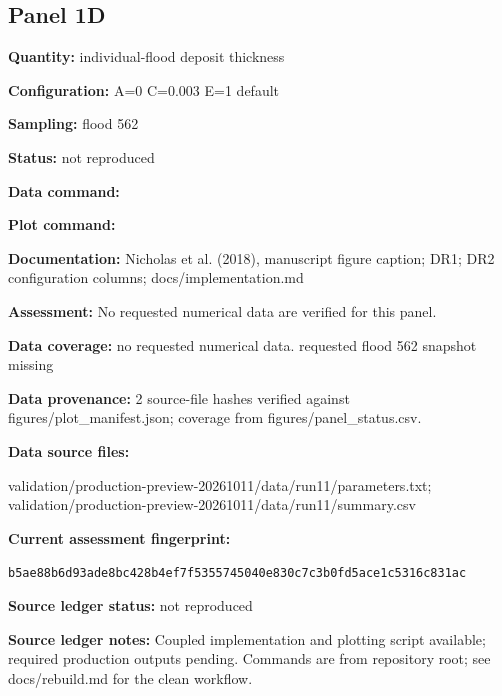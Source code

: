 \subsection*{Panel 1D}
\textbf{Quantity:} individual-flood deposit thickness

\textbf{Configuration:} A=0 C=0.003 E=1 default

\textbf{Sampling:} flood 562

\textbf{Status:} not reproduced

\textbf{Data command:}\par {\small \texttt{}}\par

\textbf{Plot command:}\par {\small \texttt{}}\par

\textbf{Documentation:} Nicholas et al. (2018), manuscript figure caption; DR1; DR2 configuration columns; docs/\allowbreak{}implementation.md

\textbf{Assessment:} No requested numerical data are verified for this panel.

\textbf{Data coverage:} no requested numerical data. requested flood 562 snapshot missing

\textbf{Data provenance:} 2 source-file hashes verified against figures/\allowbreak{}plot\_\allowbreak{}manifest.json; coverage from figures/\allowbreak{}panel\_\allowbreak{}status.csv.

\textbf{Data source files:}\par {\small\raggedright validation/\allowbreak{}production-preview-20261011/\allowbreak{}data/\allowbreak{}run11/\allowbreak{}parameters.txt; validation/\allowbreak{}production-preview-20261011/\allowbreak{}data/\allowbreak{}run11/\allowbreak{}summary.csv\par}

\textbf{Current assessment fingerprint:}\par {\small\texttt{b5ae88b6d93ade8bc428b4ef7f5355745040e830c7c3b0fd5ace1c5316c831ac}}\par

\textbf{Source ledger status:} not reproduced

\textbf{Source ledger notes:} Coupled implementation and plotting script available; required production outputs pending. Commands are from repository root; see docs/\allowbreak{}rebuild.md for the clean workflow.

